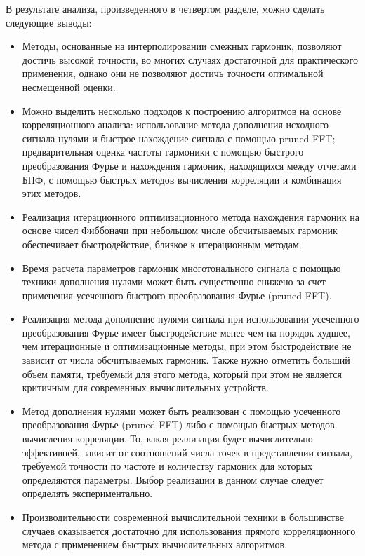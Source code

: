 В результате анализа, произведенного в четвертом разделе, можно сделать следующие выводы:
\begin{itemize}
\item Методы, основанные на интерполировании смежных гармоник, позволяют достичь высокой точности, во многих случаях достаточной для практического применения, однако они не позволяют достичь точности оптимальной несмещенной оценки.

\item Можно выделить несколько подходов к построению алгоритмов на основе корреляционного анализа: использование метода дополнения исходного сигнала нулями и быстрое нахождение сигнала с помощью pruned FFT; предварительная оценка частоты гармоники с помощью быстрого преобразования Фурье и нахождения гармоник, находящихся между отчетами БПФ, с помощью быстрых методов вычисления корреляции и комбинация этих методов.

\item Реализация итерационного оптимизационного метода нахождения гармоник на основе чисел Фиббоначи при небольшом числе обсчитываемых гармоник обеспечивает быстродействие, близкое к итерационным методам. 

\item Время расчета параметров гармоник многотонального сигнала с помощью техники дополнения нулями может быть существенно снижено за счет применения усеченного быстрого преобразования Фурье (pruned FFT).

\item Реализация метода дополнение нулями сигнала при использовании усеченного преобразования Фурье имеет быстродействие менее чем на порядок худшее, чем итерационные и оптимизационные методы, при этом быстродействие не зависит от числа обсчитываемых гармоник. Также нужно отметить больший объем памяти, требуемый для этого метода, который при этом не является критичным для современных вычислительных устройств.

\item Метод дополнения нулями может быть реализован с помощью усеченного преобразования Фурье (pruned FFT) либо с помощью быстрых методов вычисления корреляции. То, какая реализация будет вычислительно эффективней, зависит от соотношений числа точек в представлении сигнала, требуемой точности по частоте и количеству гармоник для которых определяются параметры. Выбор реализации в данном случае следует определять экспериментально.

\item Производительности современной вычислительной техники в большинстве случаев оказывается достаточно для использования прямого корреляционного метода с применением быстрых вычислительных алгоритмов.
\end{itemize}

